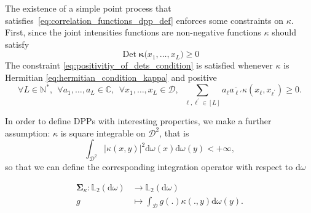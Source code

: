 \documentclass[twoside,11pt]{book}
\numberwithin{theorem}{chapter}
\numberwithin{definition}{chapter}
\numberwithin{proposition}{chapter}
\numberwithin{corollary}{chapter}
\numberwithin{example}{chapter}
\numberwithin{lemma}{chapter}
\numberwithin{assumption}{chapter}
\numberwithin{equation}{chapter}
\numberwithin{figure}{chapter}
\DeclareMathOperator{\Det}{Det}
\begin{document}
The existence of a simple point process that satisfies~\eqref{eq:correlation_functions_dpp_def} enforces some constraints on $\kappa$. First, since the joint intensities functions are non-negative functions $\kappa$ should satisfy 
\begin{equation}\label{eq:positivitiy_of_dets_condition}
\Det \bm{\kappa}\big(x_{1}, \dots, x_{L} \big) \geq 0 %
\end{equation}
The constraint \eqref{eq:positivitiy_of_dets_condition} is satisfied whenever $\kappa$ is Hermitian \eqref{eq:hermitian_condition_kappa}
and positive
\begin{equation}\label{eq:positivity_condition_kappa}
\forall L \in \mathbb{N}^{*}, \:\:\forall a_{1}, \dots, a_{L} \in \mathbb{C}, \:\:\forall x_{1}, \dots, x_{L} \in \mathcal{D}, \:\: \sum\limits_{\ell,\ell^{'} \in [L]} a_{\ell}\overline{a_{\ell'}} \kappa(x_{\ell},x_{\ell^{'}}) \geq 0.
\end{equation} 





In order to define DPPs with interesting properties, we make a further assumption: $\kappa$ is square integrable on $\mathcal{D}^{2}$, that is 
\begin{equation}\label{eq:integrability_condition_kappa}
\int_{\mathcal{D}^{2}} |\kappa(x,y)|^{2} \mathrm{d}\omega(x) \mathrm{d}\omega(y) < +\infty,
\end{equation}
so that we can define the corresponding integration operator with respect to $\mathrm{d}\omega$



\begin{align}
  \bm{\Sigma}_{\kappa} : \mathbb{L}_{2}(\mathrm{d}\omega) & \longrightarrow \mathbb{L}_{2}(\mathrm{d}\omega) \nonumber \\
  g & \longmapsto \int_{\mathcal{D}}g(.) \kappa(.,y) \mathrm{d}\omega(y). \nonumber
\end{align}
\end{document}

